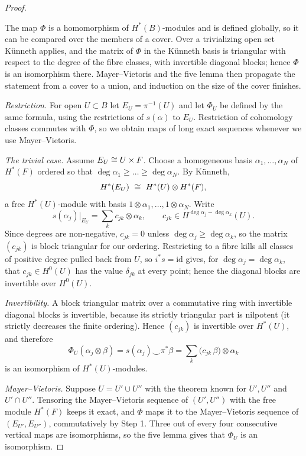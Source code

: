 \begin{proof}
\begin{strategy}
The map $\Phi$ is a homomorphism of $H^*(B)$-modules and is defined globally, so
it can be compared over the members of a cover. Over a trivializing open set
K\"unneth applies, and the matrix of $\Phi$ in the K\"unneth basis is triangular
with respect to the degree of the fibre classes, with invertible diagonal
blocks; hence $\Phi$ is an isomorphism there. Mayer--Vietoris and the five lemma
then propagate the statement from a cover to a union, and induction on the size
of the cover finishes.
\end{strategy}

 \emph{Restriction.} For open $U\subset B$ let $E_U=\pi^{-1}(U)$ and let
$\Phi_U$ be defined by the same formula, using the restrictions of $s(\alpha)$ to
$E_U$. Restriction of cohomology classes commutes with $\Phi$, so we obtain maps
of long exact sequences whenever we use Mayer--Vietoris.

 \emph{The trivial case.} Assume $E_U\cong U\times F$. Choose a
homogeneous basis $\alpha_1,\dots,\alpha_N$ of $H^*(F)$ ordered so that
$\deg\alpha_1\ge\dots\ge\deg\alpha_N$. By K\"unneth,
\[
H^*(E_U)\ \cong\ H^*(U)\otimes H^*(F),
\]
a free $H^*(U)$-module with basis $1\otimes\alpha_1,\dots,1\otimes\alpha_N$.
Write
\[
s(\alpha_j)\big|_{E_U}=\sum_{k}c_{jk}\otimes\alpha_k,
\qquad c_{jk}\in H^{\deg\alpha_j-\deg\alpha_k}(U).
\]
Since degrees are non-negative, $c_{jk}=0$ unless
$\deg\alpha_j\ge\deg\alpha_k$, so the matrix $(c_{jk})$ is block triangular for
our ordering. Restricting to a fibre kills all classes of positive degree
pulled back from $U$, so $i^*s=\mathrm{id}$ gives, for
$\deg\alpha_j=\deg\alpha_k$, that $c_{jk}\in H^0(U)$ has the value $\delta_{jk}$
at every point; hence the diagonal blocks are invertible over $H^0(U)$.

 \emph{Invertibility.} A block triangular matrix over a commutative
ring with invertible diagonal blocks is invertible, because its strictly
triangular part is nilpotent (it strictly decreases the finite ordering). Hence
$(c_{jk})$ is invertible over $H^*(U)$, and therefore
\[
\Phi_U(\alpha_j\otimes\beta)=s(\alpha_j)\smile\pi^*\beta
=\sum_k\big(c_{jk}\,\beta\big)\otimes\alpha_k
\]
is an isomorphism of $H^*(U)$-modules.

 \emph{Mayer--Vietoris.} Suppose $U=U'\cup U''$ with the theorem known
for $U',U''$ and $U'\cap U''$. Tensoring the Mayer--Vietoris sequence of
$(U',U'')$ with the free module $H^*(F)$ keeps it exact, and $\Phi$ maps it to
the Mayer--Vietoris sequence of $(E_{U'},E_{U''})$, commutatively by Step 1.
Three out of every four consecutive vertical maps are isomorphisms, so the five
lemma gives that $\Phi_U$ is an isomorphism.


\end{proof}
